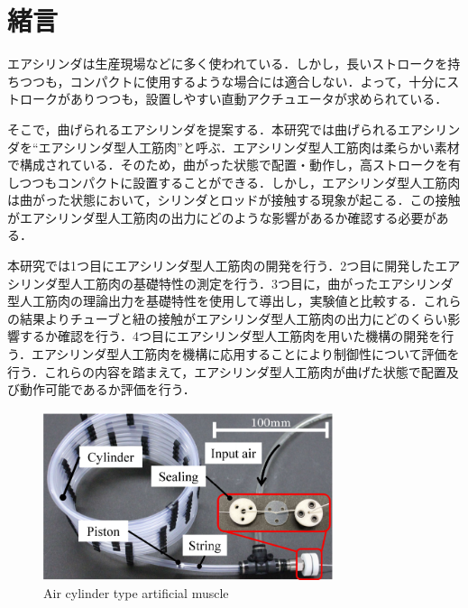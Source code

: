\section{緒言}%
エアシリンダは生産現場などに多く使われている．しかし，長いストロークを持ちつつも，コンパクトに使用するような場合には適合しない．よって，十分にストロークがありつつも，設置しやすい直動アクチュエータが求められている．
\par
そこで，曲げられるエアシリンダを提案する．本研究では曲げられるエアシリンダを``エアシリンダ型人工筋肉''と呼ぶ．エアシリンダ型人工筋肉は柔らかい素材で構成されている．そのため，曲がった状態で配置・動作し，高ストロークを有しつつもコンパクトに設置することができる．しかし，エアシリンダ型人工筋肉は曲がった状態において，シリンダとロッドが接触する現象が起こる．この接触がエアシリンダ型人工筋肉の出力にどのような影響があるか確認する必要がある．
\par
本研究では1つ目にエアシリンダ型人工筋肉の開発を行う．2つ目に開発したエアシリンダ型人工筋肉の基礎特性の測定を行う．3つ目に，曲がったエアシリンダ型人工筋肉の理論出力を基礎特性を使用して導出し，実験値と比較する．これらの結果よりチューブと紐の接触がエアシリンダ型人工筋肉の出力にどのくらい影響するか確認を行う．4つ目にエアシリンダ型人工筋肉を用いた機構の開発を行う．エアシリンダ型人工筋肉を機構に応用することにより制御性について評価を行う．これらの内容を踏まえて，エアシリンダ型人工筋肉が曲げた状態で配置及び動作可能であるか評価を行う．


\begin{figure}[t]
  \centering
  \includegraphics[width=85mm]{_pdf/細径柔軟エアシリンダ-１本.pdf}
  \caption{Air cylinder type artificial muscle}
  \label{Air cylinder type artificial muscle}
\end{figure}

